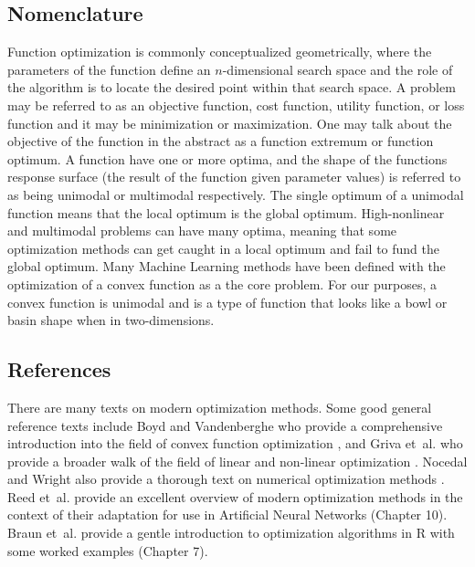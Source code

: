 \begin{bibunit}
\subsection{Nomenclature}
Function optimization is commonly conceptualized geometrically, where the parameters of the function define an $n$-dimensional search space and the role of the algorithm is to locate the desired point within that search space.
A problem may be referred to as an objective function, cost function, utility function, or loss function and it may be minimization or maximization. One may talk about the objective of the function in the abstract as a function extremum or function optimum. 
A function have one or more optima, and the shape of the functions response surface (the result of the function given parameter values) is referred to as being unimodal or multimodal respectively. The single optimum of a unimodal function means that the local optimum is the global optimum. High-nonlinear and multimodal problems can have many optima, meaning that some optimization methods can get caught in a local optimum and fail to fund the global optimum.
Many Machine Learning methods have been defined with the optimization of a convex function as a the core problem. For our purposes, a convex function is unimodal and is a type of function that looks like a bowl or basin shape when in two-dimensions.

\subsection{References}
There are many texts on modern optimization methods. Some good general reference texts include Boyd and Vandenberghe  who provide a comprehensive introduction into the field of convex function optimization \cite{Boyd2004}, and Griva et~al. who provide a broader walk of the field of linear and non-linear optimization \cite{Griva2009}. Nocedal and Wright also provide a thorough text on numerical optimization methods \cite{Nocedal1999}.
Reed et~al. provide an excellent overview of modern optimization methods in the context of their adaptation for use in Artificial Neural Networks \cite{Reed1998} (Chapter 10).
Braun et~al. provide a gentle introduction to optimization algorithms in R with some worked examples \cite{Braun2007} (Chapter 7).

\putbib
\end{bibunit}

